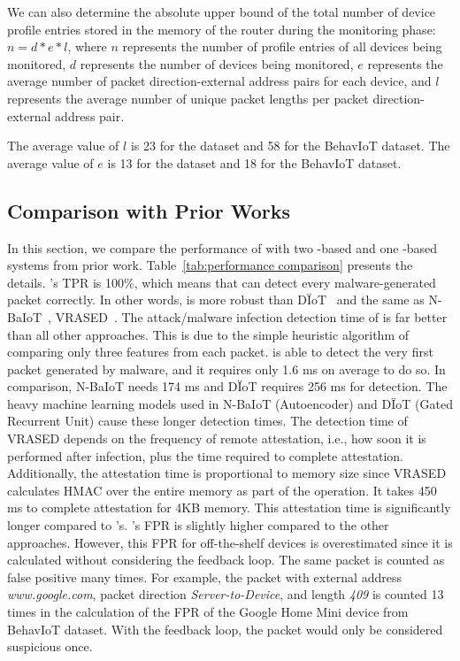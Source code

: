 We can also determine the absolute upper bound of the total number of device profile entries stored in the memory of the router during the monitoring phase: $n=d * e * l $,
where $n$ represents the number of profile entries of all devices being monitored, $d$ represents the number of devices being monitored, $e$ represents the average number of packet direction-external address pairs for each device, and $l$ represents the average number of unique packet lengths per packet direction-external address pair. 

The average value of $l$ is 23 for the \system{} dataset and 58 for the BehavIoT dataset. The average value of $e$ is 13 for the \system{} dataset and 18 for the BehavIoT dataset.

\subsection{Comparison with Prior Works}
\label{subsec: comparison-prior-works}
In this section, we compare the performance of \system{} with two \ta-based  \cite{meidan2018n,nguyen2019diot} and one \ra-based \cite{vrasedp} systems from prior work. Table~\ref{tab:performance comparison} presents the details. \system{}'s TPR is 100\%, which means that \system can detect every malware-generated packet correctly. In other words, \system{} is more robust than D\"IoT~\cite{nguyen2019diot} and the same as N-BaIoT~\cite{meidan2018n}, VRASED~\cite{vrasedp}. The attack/malware infection detection time of \system{} is far better than all other approaches. This is due to the simple heuristic algorithm of comparing only three features from each packet. \system{} is able to detect the very first packet generated by malware, and it requires only 1.6 ms on average to do so. In comparison, N-BaIoT needs 174 ms and D\"IoT requires 256 ms for detection. The heavy machine learning models used in N-BaIoT (Autoencoder) and D\"IoT (Gated Recurrent Unit) cause these longer detection times. The detection time of VRASED depends on the frequency of remote attestation, i.e., how soon it is performed after infection, plus the time required to complete attestation. Additionally, the attestation time is proportional to memory size since VRASED calculates HMAC over the entire memory as part of the operation. It takes 450 ms to complete attestation for 4KB memory. This attestation time is significantly longer compared to \system{}'s. \system{}'s FPR is slightly higher compared to the other approaches. However, this FPR for off-the-shelf devices is overestimated since it is calculated without considering the feedback loop. The same packet is counted as false positive many times. For example, the packet with external address \textit{www.google.com}, packet direction \textit{Server-to-Device}, and length \textit{409} is counted 13 times in the calculation of the FPR of the Google Home Mini device from BehavIoT dataset. With the feedback loop, the packet would only be considered suspicious once. 
